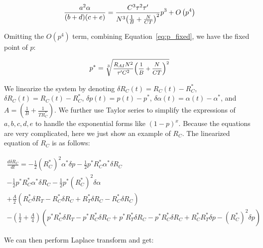 \begin{equation}
\small
\frac{{{a^2}\alpha }}{{(b + d)(c + e)}} = \frac{{{C^3}{\tau ^2}\tau '}}{{{N^3}{{\left( {\frac{1}{B} + \frac{N}{{CT}}} \right)}^2}}}{p^3} + O\left( {{p^4}} \right)
\end{equation}

Omitting the $O(p^4)$ term, combining Equation~\ref{eq:p_fixed}, we have the fixed point of $p$:

\begin{equation}
\small
{p^*} = \sqrt[3]{{\frac{{{R_{AI}}{N^2}}}{{\tau '{C^2}}}{{\left( {\frac{1}{B} + \frac{N}{{CT}}} \right)}^2}}}
\end{equation}

We linearize the system by denoting $\delta {R_C}(t) = {R_C}(t) - R_C^*$, $\delta {R_C}(t) = {R_C}(t) - R_C^*$,
$\delta p(t) = p(t) - p^*$, $\delta \alpha (t) = \alpha (t) - \alpha^*$, and $A = \left( {\frac{1}{B} + \frac{1}{{TR_C^*}}} \right)$.
We further use Taylor series to simplify the expressions of $a, b, c, d, e$ to handle the exponential forms like $(1-p)^x$.
Because the equations are very complicated, here we just show an example of $R_C$. The linearized equation of $R_C$ is as follows:

\begin{equation}
\begin{array}{l}
\frac{{d\delta {R_C}}}{{dt}} =  - \frac{1}{2}{(R_C^*)^2}{\alpha ^*}\delta p - \frac{1}{2}{p^*}R_C^*{\alpha ^*}\delta R_C \\
 - \frac{1}{2}{p^*}R_C^*{\alpha ^*}\delta {R_C} - \frac{1}{2}{p^*}{(R_C^*)^2}\delta \alpha \\
 + \frac{A}{2}\left( {R_C^*\delta {R_T} - R_C^*\delta {R_C} + R_T^*\delta {R_C} - R_C^*\delta R_C} \right)\\
 - \left( {\frac{1}{2} + \frac{A}{4}} \right)\left( {{p^*}R_C^*\delta {R_T} - {p^*}R_C^*\delta {R_C} + {p^*}R_T^*\delta {R_C} - {p^*}R_C^*\delta R_C + R_C^*R_T^*\delta p - {{(R_C^*)}^2}\delta p} \right)
\end{array}
\end{equation}

We can then perform Laplace transform and get:

